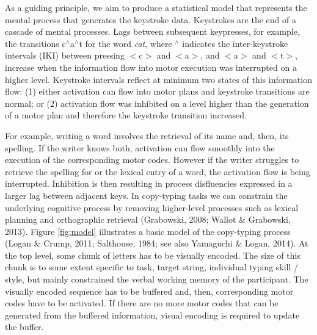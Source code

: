 \documentclass[
  english,
  man,mask,floatsintext]{apa7}
\begin{document}
As a guiding principle, we aim to produce a statistical model that represents the mental process that generates the keystroke data. Keystrokes are the end of a cascade of mental processes. Lags between subsequent keypresses, for example, the transitions c\(^{\wedge}\)a\(^{\wedge}\)t for the word \emph{cat}, where \(^{\wedge}\) indicates the inter-keystroke intervals (IKI) between pressing \(<\)c\(>\) and \(<\)a\(>\), and \(<\)a\(>\) and \(<\)t\(>\), increase when the information flow into motor execution was interrupted on a higher level. Keystroke intervals reflect at minimum two states of this information flow: (1) either activation can flow into motor plans and keystroke transitions are normal; or (2) activation flow was inhibited on a level higher than the generation of a motor plan and therefore the keystroke transition increased.

For example, writing a word involves the retrieval of its name and, then, its spelling. If the writer knows both, activation can flow smoothly into the execution of the corresponding motor codes. However if the writer struggles to retrieve the spelling for or the lexical entry of a word, the activation flow is being interrupted. Inhibition is then resulting in process disfluencies expressed in a larger lag between adjacent keys. In copy-typing tasks we can constrain the underlying cognitive process by removing higher-level processes such as lexical planning and orthographic retrieval (Grabowski, 2008; Wallot \& Grabowski, 2013). Figure \ref{fig:model} illustrates a basic model of the copy-typing process (Logan \& Crump, 2011; Salthouse, 1984; see also Yamaguchi \& Logan, 2014). At the top level, some chunk of letters has to be visually encoded. The size of this chunk is to some extent specific to task, target string, individual typing skill / style, but mainly constrained the verbal working memory of the participant. The visually encoded sequence has to be buffered and, then, corresponding motor codes have to be activated. If there are no more motor codes that can be generated from the buffered information, visual encoding is required to update the buffer.
\end{document}
